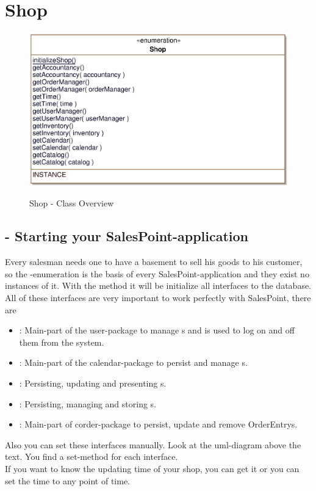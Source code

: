 \section{Shop}
\label{shop}

\begin{figure}[ht]
	\centering
  \includegraphics[width=1.0\textwidth]{images/Shop_Overview.eps}
	\label{shop_overview}
	\caption{Shop - Class Overview}
\end{figure}

\subsection{ - Starting your SalesPoint-application}
Every salesman needs one  to have a basement to sell his goods to his customer, so the -enumeration is the basis of every SalesPoint-application and they exist no 
instances of it. With the method  it will be initialize all interfaces to the database. All of these interfaces are very important to work perfectly with SalesPoint,
there are
\begin{itemize}
\item {}: Main-part of the user-package to manage s and is used to log on and off them from the system.
\item {}: Main-part of the calendar-package to persist and manage s.
\item {}: Persisting, updating and presenting s.
\item {}: Persisting, managing and storing s.
\item {}: Main-part of corder-package to persist, update and remove {OrderEntry}s.
\end{itemize}
Also you can set these interfaces manually. Look at the uml-diagram above the text. You find a set-method for each interface.\\ If you want to know the updating time of your shop, you can get 
it or you can set the time to any point of time.
